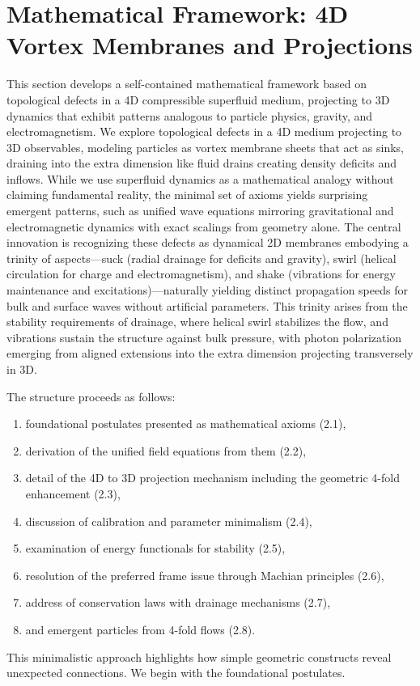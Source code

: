 \section{Mathematical Framework: 4D Vortex Membranes and Projections}

This section develops a self-contained mathematical framework based on topological defects in a 4D compressible superfluid medium, projecting to 3D dynamics that exhibit patterns analogous to particle physics, gravity, and electromagnetism. We explore topological defects in a 4D medium projecting to 3D observables, modeling particles as vortex membrane sheets that act as sinks, draining into the extra dimension like fluid drains creating density deficits and inflows. While we use superfluid dynamics as a mathematical analogy without claiming fundamental reality, the minimal set of axioms yields surprising emergent patterns, such as unified wave equations mirroring gravitational and electromagnetic dynamics with exact scalings from geometry alone. The central innovation is recognizing these defects as dynamical 2D membranes embodying a trinity of aspects---suck (radial drainage for deficits and gravity), swirl (helical circulation for charge and electromagnetism), and shake (vibrations for energy maintenance and excitations)---naturally yielding distinct propagation speeds for bulk and surface waves without artificial parameters. This trinity arises from the stability requirements of drainage, where helical swirl stabilizes the flow, and vibrations sustain the structure against bulk pressure, with photon polarization emerging from aligned extensions into the extra dimension projecting transversely in 3D.

The structure proceeds as follows:
\begin{enumerate}
\item foundational postulates presented as mathematical axioms (2.1),
\item derivation of the unified field equations from them (2.2),
\item detail of the 4D to 3D projection mechanism including the geometric 4-fold enhancement (2.3),
\item discussion of calibration and parameter minimalism (2.4),
\item examination of energy functionals for stability (2.5),
\item resolution of the preferred frame issue through Machian principles (2.6),
\item address of conservation laws with drainage mechanisms (2.7),
\item and emergent particles from 4-fold flows (2.8).
\end{enumerate}
This minimalistic approach highlights how simple geometric constructs reveal unexpected connections. We begin with the foundational postulates.

